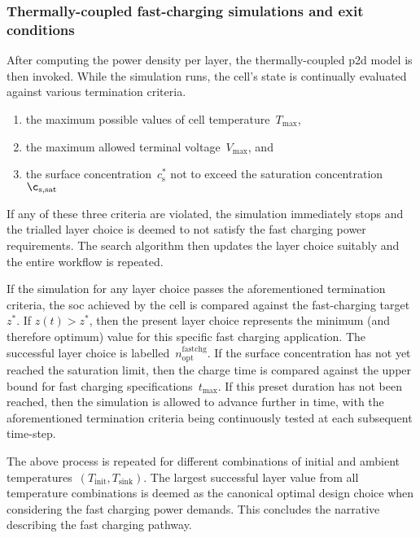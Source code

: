 \subsubsection*{Thermally-coupled fast-charging simulations and exit conditions}

After computing  the power  density per  layer, the  thermally-coupled \gls{p2d}
model  is  then  invoked.  While  the  simulation  runs,  the  cell's  state  is
continually evaluated against various termination criteria.
\begin{enumerate}
    \item the maximum possible values of cell temperature~$T_\text{max}$,
    \item the maximum allowed terminal voltage~$V_\text{max}$, and
    \item the surface concentration~$c_\text{s}^{\ast}$ not to exceed the saturation concentration~$\c_\text{s,sat}$
\end{enumerate}

If any  of these three criteria  are violated, the simulation  immediately stops
and the trialled layer  choice is deemed to not satisfy  the fast charging power
requirements. The  search algorithm then  updates the layer choice  suitably and
the entire workflow is repeated.

If the  simulation for  any layer choice  passes the  aforementioned termination
criteria,  the  \gls{soc}   achieved  by  the  cell  is   compared  against  the
fast-charging   target~$z^\ast$.  If   $z(t)   >  z^\ast$,   then  the   present
layer  choice  represents   the  minimum  (and  therefore   optimum)  value  for
this  specific  fast  charging  application.  The  successful  layer  choice  is
labelled~$n_\text{opt}^\text{fastchg}$. If the surface concentration has not yet
reached the saturation limit, then the charge time is compared against the upper
bound for  fast charging specifications~$t_\text{max}$. If  this preset duration
has not been reached, then the simulation is allowed to advance further in time,
with the aforementioned  termination criteria being continuously  tested at each
subsequent time-step.

The above process is repeated for  different combinations of initial and ambient
temperatures~\mbox{$(T_\text{init},  T_\text{sink})$}.  The  largest  successful
layer value from all temperature combinations is deemed as the canonical optimal
design choice when  considering the fast charging power  demands. This concludes
the  narrative describing  the  fast charging  pathway.

